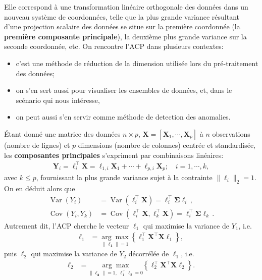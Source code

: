 Elle correspond à une  transformation linéaire orthogonale des données dans un nouveau système de coordonnées, telle que la plus grande variance résultant d’une projection scalaire des données se situe sur la première coordonnée (la \textbf{première composante principale}), la deuxième plus grande variance sur la seconde coordonnée, etc. 
\newl On rencontre l'ACP dans plusieurs contextes: 
\begin{itemize}[noitemsep]
    \item c'est une m\'ethode de réduction de la dimension utilis\'ee lors du  pré-traitement des donn\'ees;
    \item on s'en sert aussi pour visualiser les ensembles de donn\'ees, et, dans le sc\'enario qui nous int\'eresse, 
    \item on peut aussi s'en servir comme m\'ethode de detection des anomalies.
\end{itemize}
Étant donné une matrice des données $n\times p$, $\textbf{X}=[\textbf{X}_1,\cdots,\textbf{X}_p]$ à $n$ observations (nombre de lignes) et $p$ dimensions (nombre de colonnes) centrée et standardis\'ee, les \textbf{composantes principales} s'expriment par combinaisons linéaires: 
\begin{align*}
\textbf{Y}_i=\ell^{\!\top}_i\textbf{X}=\ell_{1,i}\textbf{X}_1+\cdots+\ell_{p,i}\textbf{X}_p;\quad i=1,\cdots,k,
\end{align*}
avec $k\leq p$, fournissant la plus grande variance sujet à la contrainte $\|\ell_i\|_2=1$. On en déduit alors que 
\begin{align*}
\operatorname{Var}\left(Y_{i}\right) &=\operatorname{Var}\left(\ell_{i}^{\!\top} \boldsymbol{X}\right)=\ell_{i}^{\!\top} \boldsymbol{\Sigma} \ell_{i} \,,\\ 
\operatorname{Cov}\left(Y_{i}, Y_{k}\right) &=\operatorname{Cov}\left(\ell_{i}^{\!\top} \boldsymbol{X}, \ell_{k}^{\!\top} \boldsymbol{X}\right)=\ell_{i}^{\!\top} \boldsymbol{\Sigma} \ell_{k}\, .
\end{align*}
Autrement dit, l'ACP cherche le vecteur $\ell_{1}$ qui  maximise la variance de $Y_1$, i.e. 
\begin{align*}
\mathbf{\ell}_{1}&=\underset{\|\mathbf{\ell_1}\|=1}{\arg \max }\left\{\ell^{\!\top}_1\mathbf{X}^{\!\top} \mathbf{X} \ell_1\right\},
\end{align*}
puis $\ell_2$ qui maximise la variance de $Y_2$ décorrélée de $\ell_1$, i.e.   
\begin{align*}
\mathbf{\ell}_{2}& =\underset{\|\mathbf{\ell_2}\|=1,\; \ell_{1}^{\!\top}\ell_{2} =0}{\arg \max }\left\{\ell^{\!\top}_2\mathbf{X}^{\!\top} \mathbf{X} \ell_2\right\}.
\end{align*}
